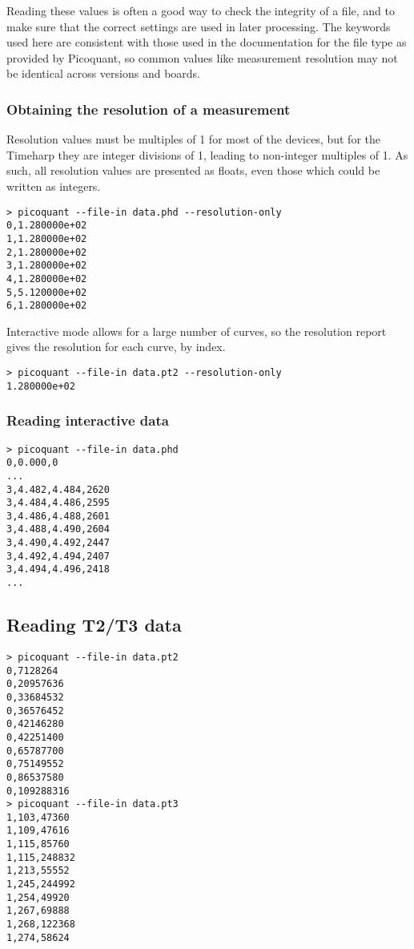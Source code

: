 \documentclass{article}
\begin{document}
Reading these values is often a good way to check the integrity of a file, and to make sure that the correct settings are used in later processing. The keywords used here are consistent with those used in the documentation for the file type as provided by Picoquant, so common values like measurement resolution may not be identical across versions and boards. 

\subsubsection{Obtaining the resolution of a measurement}
Resolution values must be multiples of 1\pico\second{} for most of the devices, but for the Timeharp they are integer divisions of 1\nano\second, leading to non-integer multiples of 1\pico\second. As such, all resolution values are presented as floats, even those which could be written as integers.
\begin{verbatim}
> picoquant --file-in data.phd --resolution-only
0,1.280000e+02
1,1.280000e+02
2,1.280000e+02
3,1.280000e+02
4,1.280000e+02
5,5.120000e+02
6,1.280000e+02
\end{verbatim}
Interactive mode allows for a large number of curves, so the resolution report gives the resolution for each curve, by index.
\begin{verbatim}
> picoquant --file-in data.pt2 --resolution-only
1.280000e+02
\end{verbatim}

\subsubsection{Reading interactive data}
\begin{verbatim}
> picoquant --file-in data.phd
0,0.000,0
...
3,4.482,4.484,2620
3,4.484,4.486,2595
3,4.486,4.488,2601
3,4.488,4.490,2604
3,4.490,4.492,2447
3,4.492,4.494,2407
3,4.494,4.496,2418
...
\end{verbatim}

\subsection{Reading T2/T3 data}
\begin{verbatim}
> picoquant --file-in data.pt2
0,7128264
0,20957636
0,33684532
0,36576452
0,42146280
0,42251400
0,65787700
0,75149552
0,86537580
0,109288316
> picoquant --file-in data.pt3
1,103,47360
1,109,47616
1,115,85760
1,115,248832
1,213,55552
1,245,244992
1,254,49920
1,267,69888
1,268,122368
1,274,58624
\end{verbatim}
\end{document}

